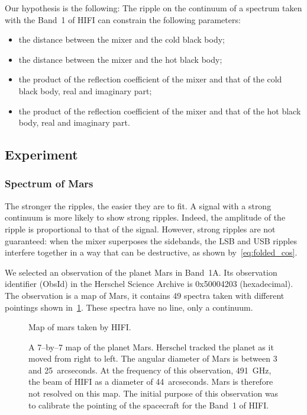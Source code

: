 Our hypothesis is the following:
The ripple on the continuum of a spectrum taken with the Band~1 of HIFI can constrain the following parameters:
\begin{itemize}
    \item the distance between the mixer and the cold black body;
    \item the distance between the mixer and the hot black body;
    \item the product of the reflection coefficient of the mixer and that of the cold black body, real and imaginary part;
    \item the product of the reflection coefficient of the mixer and that of the hot black body, real and imaginary part.
\end{itemize}





\subsection{Experiment}

\subsubsection{Spectrum of Mars}
\label{sec:spectrum_of_mars}
The stronger the ripples, the easier they are to fit.
A signal with a strong continuum is more likely to show strong ripples.
Indeed, the amplitude of the ripple is proportional to that of the signal.
However, strong ripples are not guaranteed: when the mixer superposes the sidebands,
the LSB and USB ripples interfere together in a way that can be destructive,
as shown by~\cref{eq:folded_cos}.

We selected an observation of the planet Mars in Band~1A.
Its observation identifier (ObsId) in the Herschel Science Archive is 0x50004203 (hexadecimal).
The observation is a map of Mars, it contains 49 spectra taken with different pointings shown in~\cref{fig:mars_map}.
These spectra have no line, only a continuum.
\begin{figure}[hbtp]
    \centering
    \caption{Map of mars taken by HIFI.}
    \caption*{
        A 7--by--7 map of the planet Mars.
        Herschel tracked the planet as it moved from right to left.
        The angular diameter of Mars is between 3 and 25~arcseconds.
        At the frequency of this observation, \SI{491}{\giga\hertz}, the beam of HIFI
        as a diameter of 44~arcseconds.
        Mars is therefore not resolved on this map.
        The initial purpose of this observation was to calibrate the pointing of
        the spacecraft for the Band~1 of HIFI.
    }
    \label{fig:mars_map}
\end{figure}

